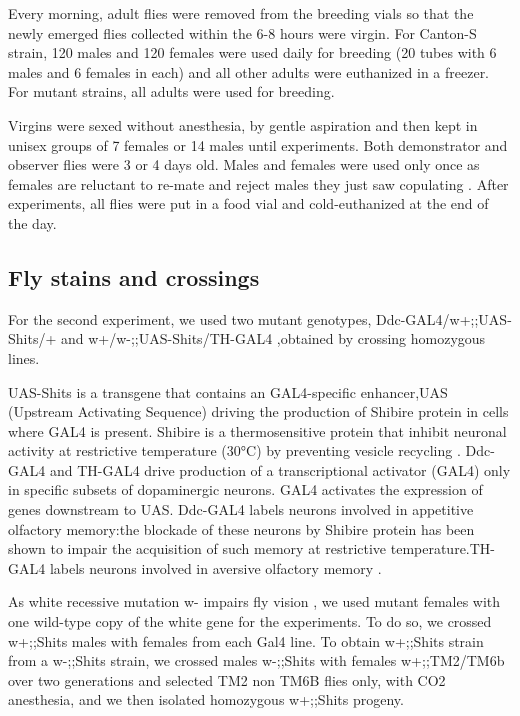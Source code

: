 \documentclass[a4paper, 12pt]{article}
\begin{document}
	Every morning, adult flies were removed from the breeding vials so that the newly emerged flies collected within the 6-8 hours were virgin. For Canton-S strain, 120 males and 120 females were used daily for breeding (20 tubes with 6 males and 6 females in each) and all other adults were euthanized in a freezer. For mutant strains, all adults were used for breeding. 
	
	Virgins were sexed without anesthesia, by gentle aspiration and then kept in unisex groups of 7 females or 14 males until experiments. Both demonstrator and observer flies were 3 or 4 days old. Males and females were used only once as females are reluctant to re-mate \parencite{chapman_sex_2003} and reject males they just saw copulating \parencite{loyau_when_2012}. After experiments, all flies were put in a food vial and cold-euthanized at the end of the day.
	
	\subsection{Fly stains and crossings}
	
	For the second experiment, we used two mutant genotypes, Ddc-GAL4/w+;;UAS-Shits/+ and w+/w-;;UAS-Shits/TH-GAL4 ,obtained by crossing homozygous lines. 
	
	UAS-Shits is a transgene that contains an GAL4-specific enhancer,UAS (Upstream Activating Sequence) driving the production of Shibire protein in cells where GAL4 is present. Shibire is a thermosensitive protein that inhibit neuronal activity at restrictive temperature (30°C) by preventing vesicle recycling \parencite{kitamoto_conditional_2001}. Ddc-GAL4 and TH-GAL4 drive production of a transcriptional activator (GAL4) only in specific subsets of dopaminergic neurons. GAL4 activates the expression of genes downstream to UAS. Ddc-GAL4 labels neurons involved in appetitive olfactory memory:the blockade of these neurons by Shibire protein has been shown to impair the acquisition of such memory at restrictive temperature.TH-GAL4 labels neurons involved in aversive olfactory memory \parencite{liu_subset_2012}.
	
	As white recessive mutation w- impairs fly vision \parencite{gotz_optomotorische_1964}, we used mutant females with one wild-type copy of the white gene for the experiments. To do so, we crossed w+;;Shits males with females from each Gal4 line. To obtain w+;;Shits strain from a w-;;Shits strain, we crossed males w-;;Shits with females w+;;TM2/TM6b over two generations and selected TM2 non TM6B flies only, with CO2 anesthesia, and we then isolated homozygous w+;;Shits progeny.
	
\end{document}
